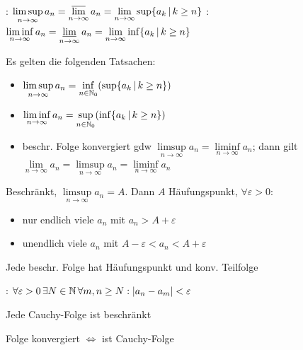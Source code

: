 \Def {}: $\limsup\limits_{n\to\infty} a_n = \varlimsup\limits_{n\to\infty} a_n = \lim\limits_{n\to\infty} \sup\{a_k \, | \, k\ge n\}$
: $\liminf\limits_{n\to\infty} a_n = \varliminf\limits_{n \to \infty} a_n = \lim\limits_{n\to\infty} \inf\{a_k \, | \, k\ge n\}$

\Satz Es gelten die folgenden Tatsachen:
\vspace{-0.6em}
\begin{itemize}
    \item $\limsup\limits_{n\to\infty} a_n = \inf\limits_{n\in\mathbb{N}_0}(\sup\{a_k \, | \, k\ge n\})$
    \item $\liminf\limits_{n\to\infty} a_n = \sup\limits_{n\in\mathbb{N}_0}(\inf\{a_k \, | \, k\ge n\})$
    \item beschr. Folge konvergiert gdw $\limsup\limits_{n\to\infty} a_n = \liminf\limits_{n\to\infty} a_n$;
    dann gilt $\lim\limits_{n\to\infty} a_n = \limsup\limits_{n\to\infty} a_n = \liminf\limits_{n\to\infty} a_n$
\end{itemize}

\Satz Beschränkt, $\limsup\limits_{n\to\infty}a_n = A$. Dann $A$ Häufungspunkt,  $\forall\varepsilon > 0$:
\vspace{-0.6em}
\begin{itemize}
    \item nur endlich viele $a_n$ mit $a_n > A + \varepsilon$
    \item unendlich viele $a_n$ mit $A - \varepsilon < a_n < A + \varepsilon$
\end{itemize}

\Kor Jede beschr. Folge hat Häufungspunkt und konv. Teilfolge

\Def {}: $\forall \varepsilon > 0 \, \exists N \in \mathbb{N} \, \forall m, n\ge N : |a_n - a_m| < \varepsilon$

\Satz Jede Cauchy-Folge ist beschränkt

\Satz Folge konvergiert $\iff$ ist Cauchy-Folge
